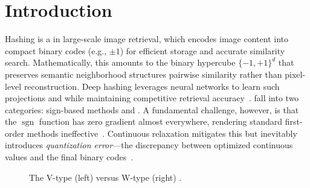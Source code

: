 \section{Introduction}

\label{Section: Introduction}
Hashing is a  in large-scale image retrieval, which encodes image content into compact binary codes (e.g., $\pm 1$) for efficient storage and accurate similarity search.
Mathematically, this amounts to  the binary hypercube $\{-1,+1\}^d$ that preserves semantic
neighborhood structures
pairwise similarity rather than pixel-level reconstruction.
Deep hashing leverages neural networks to learn such projections and
 while maintaining
competitive retrieval accuracy~\cite{luoSurveyDeepHashing2023}.
 fall into two categories: sign-based
methods and .
A fundamental challenge, however, is that the $\operatorname{sgn}$
function has zero gradient almost everywhere, rendering standard 
first-order methods ineffective~\cite{Cao2017HashNetDL}.
Continuous relaxation mitigates this but inevitably introduces 
\emph{quantization error}---the discrepancy between optimized 
continuous values and the final binary codes~\cite{weissSpectralHashing2008}.
\begin{figure}[!t]
\centering
{}
\caption{The  V-type (left) versus W-type (right) .}
\label{Fig: the W and V regularizations}
\vspace{-3ex}
\end{figure}
